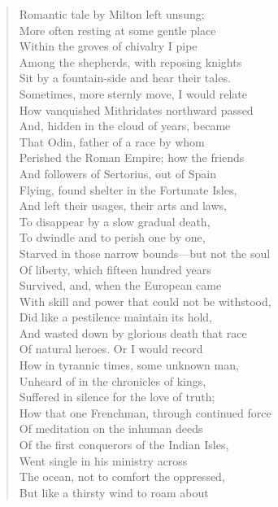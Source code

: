 \begin{verse}
Romantic tale by Milton left unsung;  \\
More often resting at some gentle place  \\
Within the groves of chivalry I pipe  \\
Among the shepherds, with reposing knights  \\
Sit by a fountain-side and hear their tales.	  \\
Sometimes, more sternly move, I would relate  \\
How vanquished Mithridates northward passed  \\
And, hidden in the cloud of years, became  \\
That Odin, father of a race by whom  \\
Perished the Roman Empire; how the friends	  \\
And followers of Sertorius, out of Spain  \\
Flying, found shelter in the Fortunate Isles,  \\
And left their usages, their arts and laws,  \\
To disappear by a slow gradual death,  \\
To dwindle and to perish one by one,	  \\
Starved in those narrow bounds---but not the soul  \\
Of liberty, which fifteen hundred years  \\
Survived, and, when the European came  \\
With skill and power that could not be withstood,  \\
Did like a pestilence maintain its hold,	  \\
And wasted down by glorious death that race  \\
Of natural heroes. Or I would record  \\
How in tyrannic times, some unknown man,  \\
Unheard of in the chronicles of kings,  \\
Suffered in silence for the love of truth;	  \\
How that one Frenchman, through continued force  \\
Of meditation on the inhuman deeds  \\
Of the first conquerors of the Indian Isles,  \\
Went single in his ministry across  \\
The ocean, not to comfort the oppressed,	  \\
But like a thirsty wind to roam about  \\

\end{verse}
